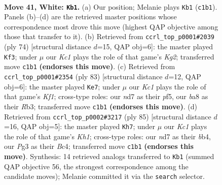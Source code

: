 \documentclass[11pt]{article}
\begin{document}
\clearpage

\begin{figure}[p]\centering
\begin{subfigure}{0.46\textwidth}\centering
\resizebox{\linewidth}{!}{%
\newchessgame
\chessboard[
  setfen={b5k1/3n4/8/8/p2p2N1/P5P1/1PP5/2K5 w - - 0 41},
  showmover=false,
  pgfstyle=straightmove, color=movearrow, markmove={c1-b1}
]}
\caption{}
\end{subfigure}\hfill
\begin{subfigure}{0.46\textwidth}\centering
\resizebox{\linewidth}{!}{%
\newchessgame
\chessboard[
  setfen={3n2k1/8/1P4p1/7p/7P/6P1/5PK1/8 w - - 1 38},
  showmover=false,
  pgfstyle=straightmove, color=movearrow, markmove={g2-f3}
]}
\caption{}
\end{subfigure}
\\[4pt]
\begin{subfigure}{0.46\textwidth}\centering
\resizebox{\linewidth}{!}{%
\newchessgame
\chessboard[
  setfen={5k2/5pp1/7p/3pPP2/6P1/1r6/5K2/R7 b - - 1 42},
  showmover=false,
  pgfstyle=straightmove, color=movearrow, markmove={f8-e7}
]}
\caption{}
\end{subfigure}\hfill
\begin{subfigure}{0.46\textwidth}\centering
\resizebox{\linewidth}{!}{%
\newchessgame
\chessboard[
  setfen={7k/6p1/5p1p/8/1Bb1PNPP/1n6/5K2/8 b - - 0 43},
  showmover=false,
  pgfstyle=straightmove, color=movearrow, markmove={h8-h7}
]}
\caption{}
\end{subfigure}
\caption{\textbf{Move 41, White: \texttt{Kb1}.} (a) Our position; Melanie plays \texttt{Kb1} (\texttt{c1b1}). Panels (b)--(d) are the retrieved master positions whose correspondence most drove this move (highest QAP objective among those that transfer to it). (b) Retrieved from \texttt{ccrl\_top\_p0001\#2039} (ply 74) [structural distance $d$=15, QAP obj=6]: the master played \texttt{Kf3}; under $\mu$ our \emph{Kc1} plays the role of that game's \emph{Kg2}; transferred move \texttt{c1b1} \textbf{(endorses this move)}. (c) Retrieved from \texttt{ccrl\_top\_p0001\#2354} (ply 83) [structural distance $d$=12, QAP obj=6]: the master played \texttt{Ke7}; under $\mu$ our \emph{Kc1} plays the role of that game's \emph{Kf1}; cross-type roles: our \emph{n}d7 as their \emph{p}f5, our \emph{b}a8 as their \emph{R}b3; transferred move \texttt{c1b1} \textbf{(endorses this move)}. (d) Retrieved from \texttt{ccrl\_top\_p0002\#3217} (ply 85) [structural distance $d$=16, QAP obj=5]: the master played \texttt{Kh7}; under $\mu$ our \emph{Kc1} plays the role of that game's \emph{Kh1}; cross-type roles: our \emph{n}d7 as their \emph{b}b4, our \emph{P}g3 as their \emph{B}c4; transferred move \texttt{c1b1} \textbf{(endorses this move)}. Synthesis: 14 retrieved analogs transferred to \texttt{Kb1} (summed QAP objective 56, the strongest correspondence among the candidate moves); Melanie committed it via the \texttt{search} selector.}
\label{fig:thought-m80}
\end{figure}
\end{document}
